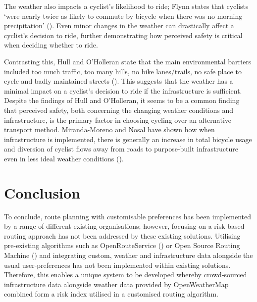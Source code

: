 The weather also impacts a cyclist's likelihood to ride; Flynn states that cyclists `were nearly twice as likely to commute by bicycle when there was no morning precipitation' (\cite{flynn_weather_2012}). Even minor changes in the weather can drastically affect a cyclist's decision to ride, further demonstrating how perceived safety is critical when deciding whether to ride. 

Contrasting this, Hull and O'Holleran state that the main environmental barriers included too much traffic, too many hills, no bike lanes/trails, no safe place to cycle and badly maintained streets (\cite{hull_bicycle_2014}). This suggests that the weather has a minimal impact on a cyclist's decision to ride if the infrastructure is sufficient. Despite the findings of Hull and O'Holleran, it seems to be a common finding that perceived safety, both concerning the changing weather conditions and infrastructure, is the primary factor in choosing cycling over an alternative transport method. Miranda-Moreno and Nosal have shown how when infrastructure is implemented, there is generally an increase in total bicycle usage and diversion of cyclist flows away from roads to purpose-built infrastructure even in less ideal weather conditions (\cite{miranda-moreno_weather_2011}).

\section{Conclusion}
\label{litrev:conclusion}

To conclude, route planning with customisable preferences has been implemented by a range of different existing organisations; however, focusing on a risk-based routing approach has not been addressed by these existing solutions. Utilising pre-existing algorithms such as OpenRouteService (\cite{noauthor_openrouteservice_nodate}) or Open Source Routing Machine (\cite{noauthor_project_nodate}) and integrating custom, weather and infrastructure data alongside the usual user-preferences has not been implemented within existing solutions. Therefore, this enables a unique system to be developed whereby crowd-sourced infrastructure data alongside weather data provided by OpenWeatherMap combined form a risk index utilised in a customised routing algorithm.
